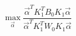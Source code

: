 \documentclass[preview]{standalone}
\begin{document}
\[
    \max_{\vec{\alpha}} \frac{\vec{\alpha}^TK_1^TB_0K_1\vec{\alpha}}{\vec{\alpha}^TK_1^TW_0K_1\vec{\alpha}}
\]
\end{document}
